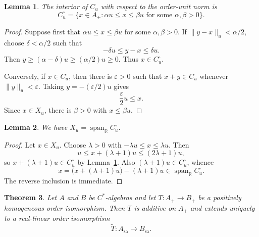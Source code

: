 \documentclass[12pt]{amsart}
\newtheorem{theorem}{Theorem}[section]
\newtheorem{lemma}[theorem]{Lemma}
\theoremstyle{remark}
\newcommand{\sa}{\mathrm{sa}}
\begin{document}
\begin{lemma}\label{lem:interior}
The interior of $C_u$ with respect to the order-unit norm is
\[
 C_u^\circ
 =\{x\in A_+: \alpha u\le x\le\beta u
       \text{ for some }\alpha,\beta>0\}.
\]
\end{lemma}

\begin{proof}
Suppose first that $\alpha u\le x\le\beta u$ for some
$\alpha,\beta>0$.  If $\|y-x\|_u<\alpha/2$, choose
$\delta<\alpha/2$ such that
\[
        -\delta u\le y-x\le\delta u.
\]
Then $y\ge(\alpha-\delta)u\ge(\alpha/2)u\ge0$.  Thus
$x\in C_u^\circ$.

Conversely, if $x\in C_u^\circ$, then there is $\varepsilon>0$ such
that $x+y\in C_u$ whenever $\|y\|_u<\varepsilon$.  Taking
$y=-(\varepsilon/2)u$ gives
\[
 \frac\varepsilon2u\le x.
\]
Since $x\in X_u$, there is $\beta>0$ with $x\le\beta u$.
\end{proof}

\begin{lemma}\label{lem:span-interior}
We have $X_u=\operatorname{span}_{\mathbb R} C_u^\circ$. 
\end{lemma}

\begin{proof}
Let $x\in X_u$.  Choose $\lambda>0$ with
$-\lambda u\le x\le\lambda u$.  Then
\[
 u\le x+(\lambda+1)u\le(2\lambda+1)u,
\]
so $x+(\lambda+1)u\in C_u^\circ$ by
Lemma~\ref{lem:interior}.  Also $(\lambda+1)u\in C_u^\circ$, whence
\[
 x=\bigl(x+(\lambda+1)u\bigr)-(\lambda+1)u
 \in\operatorname{span}_{\mathbb R}C_u^\circ.
\]
The reverse inclusion is immediate.
\end{proof}

\begin{theorem}\label{thm:extension}
Let $A$ and $B$ be $C^*$-algebras and let $ T: A_+\to B_+$ be a positively homogeneous order isomorphism. 
Then $T$ is additive on $A_+$ and extends uniquely to a real-linear
order isomorphism
\[
 \widetilde T:A_{\sa}\longrightarrow B_{\sa}.
\]
\end{theorem}
\end{document}
